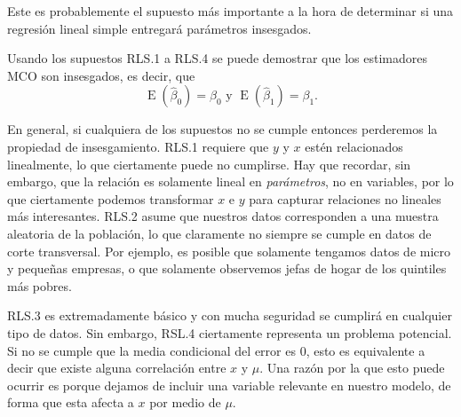 \documentclass[12pt]{report}\usepackage[]{graphicx}\usepackage[]{color}
\newcommand{\E}{\operatorname{E}}
\begin{document}
Este es probablemente el supuesto más importante a la hora de determinar si una regresión lineal simple entregará parámetros insesgados.


\hrulefill

Usando los supuestos RLS.1 a RLS.4 se puede demostrar que los estimadores MCO son insesgados, es decir, que
\begin{equation}
\E(\hat\beta_0) = \beta_0 \text{ y } \E(\hat\beta_1) = \beta_1.
\end{equation}

En general, si cualquiera de los supuestos no se cumple entonces perderemos la propiedad de insesgamiento. RLS.1 requiere que $y$ y $x$ estén relacionados linealmente, lo que ciertamente puede no cumplirse. Hay que recordar, sin embargo, que la relación es solamente lineal en \emph{parámetros}, no en variables, por lo que ciertamente podemos transformar $x$ e $y$ para capturar relaciones no lineales más interesantes.
RLS.2 asume que nuestros datos corresponden a una muestra aleatoria de la población, lo que claramente no siempre se cumple en datos de corte transversal. Por ejemplo, es posible que solamente tengamos datos de micro y pequeñas empresas, o que solamente observemos jefas de hogar de los quintiles más pobres.

RLS.3 es extremadamente básico y con mucha seguridad se cumplirá en cualquier tipo de datos. Sin embargo, RSL.4 ciertamente representa un problema potencial. Si no se cumple que la media condicional del error es 0, esto es equivalente a decir que existe alguna correlación entre $x$ y $\mu$.
Una razón por la que esto puede ocurrir es porque dejamos de incluir una variable relevante en nuestro modelo, de forma que esta afecta a $x$ por medio de $\mu$.
\end{document}
